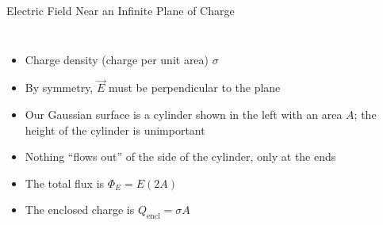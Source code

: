 \documentclass[12pt,aspectratio=169]{beamer}
\begin{document}
%
%    
%
%
%



\begin{frame}{Electric Field Near an Infinite Plane of Charge}
  \begin{columns}

    \begin{itemize}
    \item Charge density (charge per unit area) $\sigma$
    \item By symmetry, $\vec E$ must be perpendicular to the plane
    \item Our Gaussian surface is a cylinder shown in the left with an area
      $A$; the height of the cylinder is unimportant
    \item Nothing ``flows out'' of the side of the cylinder, only at the ends
    \item The total flux is $\Phi_E=E(2A)$
    \item The enclosed charge is $Q_\text{encl}=\sigma A$
    \end{itemize}
  \end{columns}
\end{frame}
\end{document}
